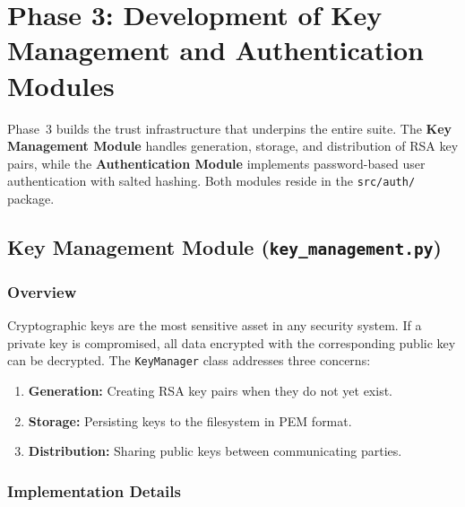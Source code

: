 \documentclass[12pt,a4paper]{article}
\begin{document}
\section{Phase 3: Development of Key Management and Authentication Modules}

Phase~3 builds the trust infrastructure that underpins the entire suite. The \textbf{Key Management Module} handles generation, storage, and distribution of RSA key pairs, while the \textbf{Authentication Module} implements password-based user authentication with salted hashing. Both modules reside in the \texttt{src/auth/} package.

\subsection{Key Management Module (\texttt{key\_management.py})}

\subsubsection{Overview}
Cryptographic keys are the most sensitive asset in any security system. If a private key is compromised, all data encrypted with the corresponding public key can be decrypted. The \texttt{KeyManager} class addresses three concerns:
\begin{enumerate}
    \item \textbf{Generation:} Creating RSA key pairs when they do not yet exist.
    \item \textbf{Storage:} Persisting keys to the filesystem in PEM format.
    \item \textbf{Distribution:} Sharing public keys between communicating parties.
\end{enumerate}

\subsubsection{Implementation Details}
\end{document}
